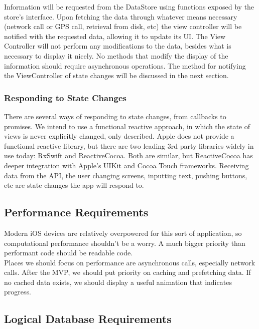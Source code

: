 \documentclass[letterpaper,10pt,titlepage]{article}
\begin{document}
Information will be requested from the DataStore using functions exposed by the store’s interface. Upon fetching the data through whatever means necessary (network call or GPS call, retrieval from disk, etc) the view controller will be notified with the requested data, allowing it to update its UI. The View Controller will not perform any modifications to the data, besides what is necessary to display it nicely. No methods that modify the display of the information should require asynchronous operations. The method for notifying the ViewController of state changes will be discussed in the next section.

\subsubsection{Responding to State Changes}

There are several ways of responding to state changes, from callbacks to promises. We intend to use a functional reactive approach, in which the state of views is never explicitly changed, only described. Apple does not provide a functional reactive library, but there are two leading 3rd party libraries widely in use today: RxSwift and ReactiveCocoa. Both are similar, but ReactiveCocoa has deeper integration with Apple’s UIKit and Cocoa Touch frameworks.
Receiving data from the API, the user changing screens, inputting text, pushing buttons, etc are state changes the app will respond to.\\

\subsection{Performance Requirements}

Modern iOS devices are relatively overpowered for this sort of application, so computational performance shouldn’t be a worry. A much bigger priority than performant code should be readable code.\\

Places we should focus on performance are asynchronous calls, especially network calls. After the MVP, we should put priority on caching and prefetching data. If no cached data exists, we should display a useful animation that indicates progress.

\subsection{Logical Database Requirements}
\end{document}
